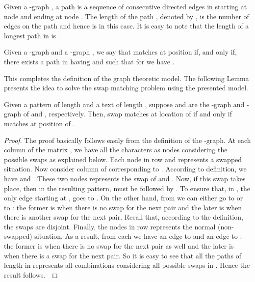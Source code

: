 \documentclass{llncs}
\begin{document}
\begin{definition}


Given a -graph , a path  is a sequence of consecutive
directed edges  in  starting at node  and ending at node
. The length of the path , denoted by , is the
number of edges on the path and hence is  in this case. It
is easy to note that the length of a longest path in  is .
\end{definition}

\begin{definition}


Given a -graph  and a -graph , we
say that  matches  at position  if, and only if,
there exists a path  in  having
 and  such that
for  we have .
\end{definition}



This completes the definition of the graph theoretic model. The following Lemma presents the idea to solve the swap matching problem using the presented model.


\begin{lemma}Given a pattern  of length  and a text  of length ,
suppose  and  are the -graph and -graph of  and , respectively. Then,  swap matches  at
location  of  if and only if  matches  at
position  of .
\end{lemma}

\begin{proof}
The proof basically follows easily from the definition of the
-graph. At each column of the matrix , we have all
the characters as nodes considering the possible swaps as explained
below. Each node in row  and  represents a swapped
situation. Now consider column  of  corresponding to .
According to definition, we have  and . These two nodes represents the swap of  and
. Now, if this swap takes place, then in the resulting
pattern,  must be followed by . To ensure that, in
, the only edge starting at , goes to . On
the other hand, from  we can either go to  or to
: the former is when there is no swap for the next pair
and the later is when there is another swap for the next pair.
Recall that, according to the definition, the swaps are disjoint.
Finally, the nodes in row  represents the normal (non-swapped)
situation. As a result, from each  we have an edge to
 and an edge to : the former is when there is
no swap for the next pair as well and the later is when there is a
swap for the next pair. So it is easy to see that all the paths of
length  in  represents all combinations considering all
possible swaps in . Hence the result follows.~
\end{proof}
\end{document}
